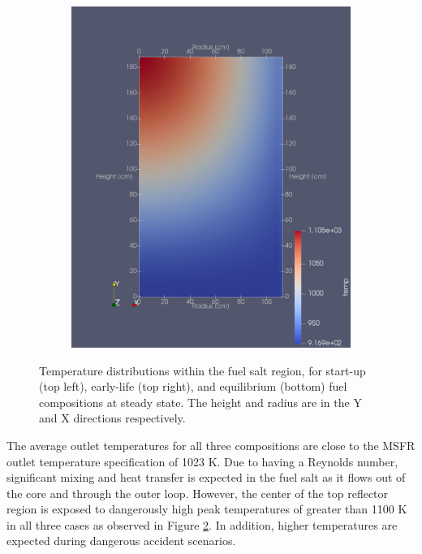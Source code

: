 \documentclass{anstrans}
\begin{document}
\begin{figure}
\begin{subfigure}{1\columnwidth}
\end{subfigure}\hfill\\
\bigskip
\centering
\begin{subfigure}{1\columnwidth}
\includegraphics[width=\columnwidth]{./figures/eqtemp}%
\label{subfigc}%
\end{subfigure}%
\captionsetup{justification=centering}
\caption{Temperature distributions within the fuel salt region, for start-up
(top left), early-life (top right), and equilibrium (bottom) fuel compositions
at steady state. The height and radius are in the Y and X directions
respectively.}
\label{fig:temp}
\end{figure}

	The average outlet temperatures for all three compositions are close to
	the \gls{MSFR} outlet temperature specification of 1023 K. Due to having a
	Reynolds number, significant
	mixing and heat transfer is expected in the fuel salt as it flows
	out of the core and through the outer loop. However, the center of the top
	reflector region is exposed to dangerously high peak temperatures
	of greater than 1100 K in all three cases as observed in Figure
	\ref{fig:temp}. In addition, higher temperatures
	are expected during dangerous accident scenarios.
	
\end{document}
